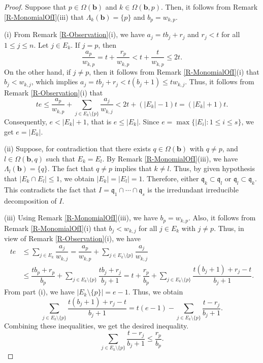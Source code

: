 \documentclass[12pt,reqno]{amsart}
\theoremstyle{definition}
\newcommand{\q}{\mathfrak{q}}
\newcommand{\bb}{\mathbf{b}}
\newcommand{\Om}{\Omega}
\newcommand{\Lm}{\Lambda}
\numberwithin{equation}{section}
\begin{document}
\begin{proof}
    Suppose that $p \in \Om(\bb)$ and $k \in \Om(\bb, p).$ Then, it follows from Remark \ref{R-MonomialOfI}(iii) that $\Lm_k(\bb) = \{p\}$ and $b_p = w_{k, p}.$
    
    \medskip\noindent
    (i) From Remark \ref{R-Observation}(i), we have $a_j = tb_j + r_j$ and $r_j < t$ for all $1 \le j \le n.$ Let $j \in E_k.$ If $j = p$, then 
    \[\dfrac{a_p}{w_{k, p}} = t + \dfrac{r_p}{w_{k, p}} < t + \dfrac{t}{w_{k, p}} \le 2t.\]
    On the other hand, if $j \ne p$, then it follows from Remark \ref{R-MonomialOfI}(i) that $b_j < w_{k, j}$, which implies $a_j = tb_j + r_j < t(b_j + 1) \le t w_{k, j}.$ Thus, it follows from Remark \ref{R-Observation}(i) that
    \[te \le \dfrac{a_p}{w_{k, p}} + \sum_{j \in E_k \setminus \{p\}} \dfrac{a_j}{w_{k, j}} < 2t + (|E_k| - 1)t = (|E_k| + 1)t.\]
    Consequently, $e < |E_k| + 1$, that is $e \le |E_k|.$ Since $e = \max \{|E_i| : 1 \le i \le s\}$, we get $e = |E_k|.$ 
    
    \medskip\noindent
    (ii) Suppose, for contradiction that there exists $q \in \Om(\bb)$ with $q \ne p$, and $l \in \Om(\bb, q)$ such that $E_k = E_l.$ By Remark \ref{R-MonomialOfI}(iii), we have $\Lm_l(\bb) = \{q\}.$ The fact that $q \ne p$ implies that $k \ne l.$ Thus, by given hypothesis that $|E_k \cap E_l| \le 1$, we obtain $|E_k| = |E_l|= 1.$ Therefore, either $\q_k \subset \q_l$ or $\q_l \subset \q_k.$
    This contradicts the fact that $I = \q_1 \cap \cdots \cap \q_s$ is the irredundant irreducible decomposition of $I.$

    \medskip\noindent
    (iii) Using Remark \ref{R-MonomialOfI}(iii), we have $b_p = w_{k, p}.$ Also, it follows from Remark \ref{R-MonomialOfI}(i) that $b_j < w_{k, j}$ for all $j \in E_k$ with $j \ne p.$ Thus, in view of Remark \ref{R-Observation}(i), we have 
    \begin{align*}
        te & \le \sum_{j \in E_k} \dfrac{a_j}{w_{k, j}} = \dfrac{a_p}{w_{k, p}} + \sum_{j \in E_k \setminus \{p\}} \dfrac{a_j}{w_{k, j}} \\  
        & \le \dfrac{tb_p + r_p}{b_p} + \sum_{j \in E_k \setminus \{p\}} \dfrac{tb_j + r_j}{b_j + 1} = t + \dfrac{r_p}{b_p} + \sum_{j \in E_k \setminus \{p\}} \dfrac{t(b_j + 1) + r_j - t}{b_j + 1}.
    \end{align*}
    From part (i), we have $|E_k \setminus \{p\}| = e - 1.$ Thus, we obtain
    \[\sum_{j \in E_k \setminus \{p\}} \dfrac{t(b_j + 1) + r_j - t}{b_j + 1} = t(e - 1) - \sum_{j \in E_k \setminus \{p\}} \dfrac{t - r_j}{b_j + 1}.\]
    Combining these inequalities, we get the desired inequality.
    \[\sum\limits_{j \in E_k \setminus \{p\}} \dfrac{t - r_j}{b_j + 1} \le \dfrac{r_p}{b_p}.\]
\end{proof}
\end{document}
